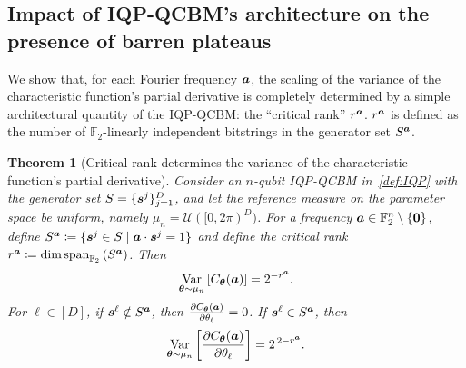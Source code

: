 \documentclass{article}
\theoremstyle{plain}
\newtheorem{theorem}{Theorem}[section]
\theoremstyle{definition}
\theoremstyle{remark}
\begin{document}
\subsection{Impact of IQP-QCBM's architecture on the presence of barren plateaus} \label{subsec:uniform}
We show that, for each Fourier frequency ${\bm{a}}$, the scaling of the variance of the characteristic function's partial derivative is completely determined by a simple architectural quantity of the IQP-QCBM: the ``critical rank'' $r^{\bm{a}}$. $r^{\bm{a}}$ is defined as the number of $\mathbb{F}_2$-linearly independent bitstrings in the generator set $S^{\bm{a}}$.
\begin{theorem}[Critical rank determines the variance of the characteristic function's partial derivative]
\label{thm:uniform}
Consider an $n$-qubit IQP-QCBM in~\cref{def:IQP} with the generator set $S=\{{\bm{s}^j}\}_{j=1}^D$, and let the reference measure on the parameter space be uniform, namely $\mu_n = \mathcal{U}([0,2\pi)^D)$. For a frequency ${\bm{a}} \in \mathbb{F}_2^n \setminus \{\mathbf{0}\}$, define $S^{{\bm{a}}} \coloneqq \{ {\bm{s}^j}\in S \mid {\bm{a}} \cdot {\bm{s}^j} = 1 \}$ and define the critical rank $r^{\bm{a}} \coloneqq \dim \operatorname{span}_{\mathbb{F}_2}\left( S^{{\bm{a}}} \right)$. Then
\begin{equation}
\operatorname*{Var}_{{\bm{\theta}}\sim\mu_n} \left[ C_{\bm{\theta}}({\bm{a}})\right] = 2^{-r^{\bm{a}}}. 
\end{equation} For $\ell \in [D]$, if ${\bm{s}^\ell} \notin S^{\bm{a}}$, then $ \frac{\partial C_{\bm{\theta}}({\bm{a}})}{\partial \theta_\ell}=0$. If ${\bm{s}^\ell} \in S^{\bm{a}}$, then
\begin{equation}
\operatorname*{Var}_{{\bm{\theta}}\sim\mu_n} \left[ \frac{\partial C_{\bm{\theta}}({\bm{a}})}{\partial \theta_\ell} \right] = 2^{\,2-r^{\bm{a}}}. \end{equation}
\end{theorem}
\end{document}
